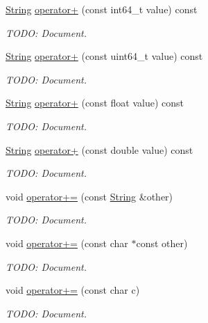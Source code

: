 \begin{DoxyCompactItemize}
\hyperlink{class_power_1_1_string}{String} \hyperlink{class_power_1_1_string_a6786c4c855394ed972fcee194f5b0b59}{operator+} (const int64\+\_\+t value) const
\begin{DoxyCompactList}\small\item\em T\+O\+DO\+: Document. \end{DoxyCompactList}\item 
\hyperlink{class_power_1_1_string}{String} \hyperlink{class_power_1_1_string_aeff2ea13da477a4e313cdac2fcea1856}{operator+} (const uint64\+\_\+t value) const
\begin{DoxyCompactList}\small\item\em T\+O\+DO\+: Document. \end{DoxyCompactList}\item 
\hyperlink{class_power_1_1_string}{String} \hyperlink{class_power_1_1_string_a011603e62e9254d7b2a95314ddaca716}{operator+} (const float value) const
\begin{DoxyCompactList}\small\item\em T\+O\+DO\+: Document. \end{DoxyCompactList}\item 
\hyperlink{class_power_1_1_string}{String} \hyperlink{class_power_1_1_string_a0957d2856d8e5693a49fef4812629459}{operator+} (const double value) const
\begin{DoxyCompactList}\small\item\em T\+O\+DO\+: Document. \end{DoxyCompactList}\item 
void \hyperlink{class_power_1_1_string_aad7a34466104387cc33cafcf04770b39}{operator+=} (const \hyperlink{class_power_1_1_string}{String} \&other)
\begin{DoxyCompactList}\small\item\em T\+O\+DO\+: Document. \end{DoxyCompactList}\item 
void \hyperlink{class_power_1_1_string_a49e4abf34ef85a8d709aa0b6e37a283e}{operator+=} (const char $\ast$const other)
\begin{DoxyCompactList}\small\item\em T\+O\+DO\+: Document. \end{DoxyCompactList}\item 
void \hyperlink{class_power_1_1_string_a52dac2961382313c2817ae2186d09a9e}{operator+=} (const char c)
\begin{DoxyCompactList}\small\item\em T\+O\+DO\+: Document. \end{DoxyCompactList}\item 

\end{DoxyCompactItemize}
